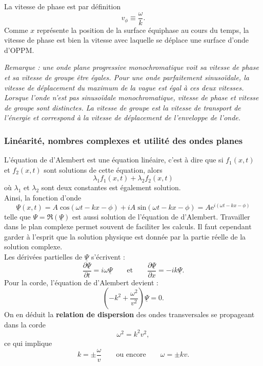 \documentclass[11pt,a4paper]{report}
\begin{document}
La vitesse de phase est par définition
\begin{equation}
	v_\phi \equiv \frac{\omega}{k}.
\end{equation}
Comme $x$ représente la position de la surface équiphase au cours du temps, la vitesse de phase est bien la vitesse avec laquelle se déplace une surface d'onde d'OPPM.

\textit{Remarque : une onde plane progressive monochromatique voit sa vitesse de phase et sa vitesse de groupe être égales. Pour une onde parfaitement sinusoïdale, la vitesse de déplacement du maximum de la vague est égal à ces deux vitesses. Lorsque l'onde n'est pas sinusoïdale monochromatique, vitesse de phase et vitesse de groupe sont distinctes. La vitesse de groupe est la vitesse de transport de l'énergie et correspond à la vitesse de déplacement de l'enveloppe de l'onde.}

\subsubsection{Linéarité, nombres complexes et utilité des ondes planes}

L'équation de d'Alembert est une équation linéaire, c'est à dire que si $f_1(x,t)$ et $f_2(x,t)$ sont solutions de cette équation, alors 
\begin{equation}
	\lambda_1 f_1(x,t) + \lambda_2 f_2(x,t)
\end{equation}
où $\lambda_1$ et $\lambda_2$ sont deux constantes est également solution.\\

Ainsi, la fonction d'onde
\begin{equation}
	\underline{\Psi}(x,t) = A\; \text{cos}\left(\omega t - kx - \phi\right) + i A\; \text{sin}\left(\omega t - kx - \phi\right) = A\text{e}^{i\left(\omega t - kx - \phi\right)}
\end{equation}
telle que $\Psi = \Re(\underline{\Psi})$ est aussi solution de l'équation de d'Alembert. Travailler dans le plan complexe permet souvent de faciliter les calculs. Il faut cependant garder à l'esprit que la solution physique est donnée par la partie réelle de la solution complexe.\\

Les dérivées partielles de $\underline{\Psi}$ s'écrivent :
\begin{equation}
	\frac{\partial \underline{\Psi}}{\partial t} = i\omega\underline{\Psi} \qquad\text{et}\qquad \frac{\partial \underline{\Psi}}{\partial x}  = -ik\underline{\Psi}.
\end{equation}
Pour la corde, l'équation de d'Alembert devient :
\begin{equation}
	\left(- k^2 + \frac{\omega^2}{v^2}\right)\underline{\Psi} = 0.
\end{equation}
On en déduit la \textbf{relation de dispersion} des ondes transversales se propageant dans la corde
\begin{equation}
	\omega^2 = k^2 v^2,
\end{equation}
ce qui implique
\begin{equation}
	k = \pm \frac{\omega}{v} \qquad \text{ou encore}\qquad \omega = \pm k v.
\end{equation}
\end{document}
